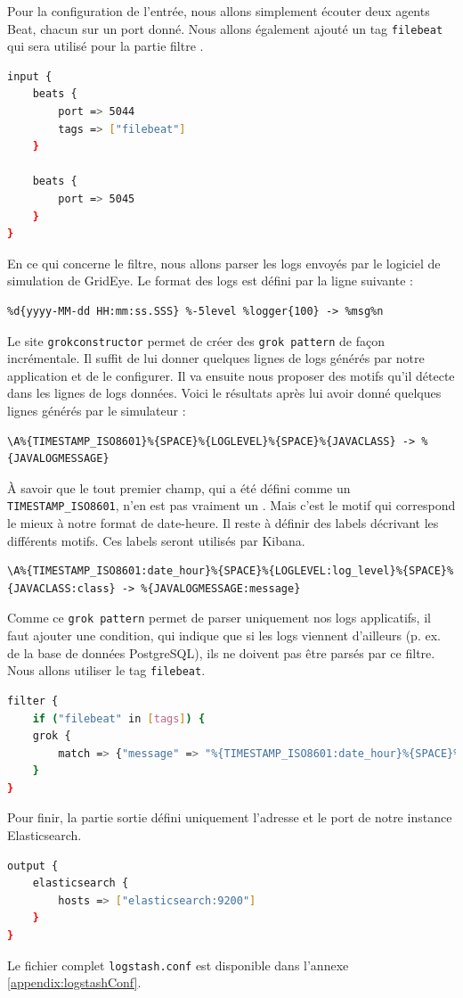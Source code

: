 \documentclass[paper=a4, fontsize=11pt]{scrartcl}
\begin{document}
Pour la configuration de l'entrée, nous allons simplement écouter deux agents Beat, chacun sur un port donné. Nous allons également ajouté un tag \verb,filebeat, qui sera utilisé pour la partie \og filtre \fg.
\begin{lstlisting}[language=bash]
input {
    beats {
        port => 5044
        tags => ["filebeat"]
    }

    beats {
        port => 5045
    }
}
\end{lstlisting}
En ce qui concerne le filtre, nous allons parser les logs envoyés par le logiciel de simulation de GridEye. Le format des logs est défini par la ligne suivante :
\begin{lstlisting}
%d{yyyy-MM-dd HH:mm:ss.SSS} %-5level %logger{100} -> %msg%n
\end{lstlisting}
Le site \verb,grokconstructor, \cite{noauthor_test_nodate} permet de créer des \verb,grok pattern, de façon incrémentale. Il suffit de lui donner quelques lignes de logs générés par notre application et de le configurer. Il va ensuite nous proposer des motifs qu'il détecte dans les lignes de logs données. Voici le résultats après lui avoir donné quelques lignes générés par le simulateur :
\begin{lstlisting}
\A%{TIMESTAMP_ISO8601}%{SPACE}%{LOGLEVEL}%{SPACE}%{JAVACLASS} -> %{JAVALOGMESSAGE}
\end{lstlisting}
À savoir que le tout premier champ, qui a été défini comme un \verb,TIMESTAMP_ISO8601,, n'en est pas vraiment un \cite{noauthor_iso_2020}. Mais c'est le motif qui correspond le mieux à notre format de date-heure.
Il reste à définir des labels décrivant les différents motifs. Ces labels seront utilisés par Kibana.
\begin{lstlisting}
\A%{TIMESTAMP_ISO8601:date_hour}%{SPACE}%{LOGLEVEL:log_level}%{SPACE}%{JAVACLASS:class} -> %{JAVALOGMESSAGE:message}
\end{lstlisting}
Comme ce \verb,grok pattern, permet de parser uniquement nos logs applicatifs, il faut ajouter une condition, qui indique que si les logs viennent d'ailleurs (p. ex. de la base de données PostgreSQL), ils ne doivent pas être parsés par ce filtre. Nous allons utiliser le tag \verb,filebeat,.
\begin{lstlisting}[language=bash]
filter {
    if ("filebeat" in [tags]) {
	grok { 
	    match => {"message" => "%{TIMESTAMP_ISO8601:date_hour}%{SPACE}%{LOGLEVEL:log_level}%{SPACE}%{JAVACLASS:class} -> %{JAVALOGMESSAGE:log_message}"}
	}
}
\end{lstlisting}
Pour finir, la partie sortie défini uniquement l'adresse et le port de notre instance Elasticsearch.
\begin{lstlisting}[language=bash]
output {
    elasticsearch {
        hosts => ["elasticsearch:9200"]
    }
}
\end{lstlisting}
Le fichier complet \verb,logstash.conf, est disponible dans l'annexe \ref{appendix:logstashConf}.
\end{document}
